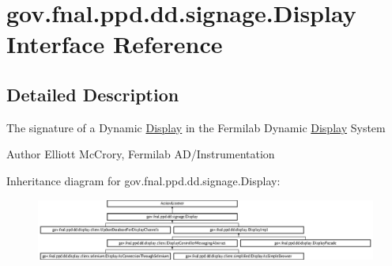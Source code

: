 \hypertarget{interfacegov_1_1fnal_1_1ppd_1_1dd_1_1signage_1_1Display}{\section{gov.\-fnal.\-ppd.\-dd.\-signage.\-Display Interface Reference}
\label{interfacegov_1_1fnal_1_1ppd_1_1dd_1_1signage_1_1Display}
}


\subsection{Detailed Description}
The signature of a Dynamic \hyperlink{interfacegov_1_1fnal_1_1ppd_1_1dd_1_1signage_1_1Display}{Display} in the Fermilab Dynamic \hyperlink{interfacegov_1_1fnal_1_1ppd_1_1dd_1_1signage_1_1Display}{Display} System

\begin{DoxyAuthor}{Author}
Elliott Mc\-Crory, Fermilab A\-D/\-Instrumentation 
\end{DoxyAuthor}
Inheritance diagram for gov.\-fnal.\-ppd.\-dd.\-signage.\-Display\-:\begin{figure}[H]
\begin{center}
\leavevmode
\includegraphics[height=2.015839cm]{interfacegov_1_1fnal_1_1ppd_1_1dd_1_1signage_1_1Display}
\end{center}
\end{figure}
